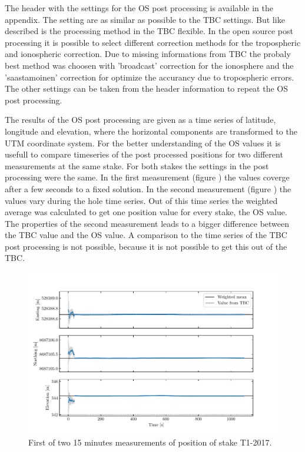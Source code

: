 The header with the settings for the OS post processing is available in the appendix.
The setting are as similar as possible to the TBC settings.
But like described is the processing method in the TBC flexible.
In the open source post processing it is possible to select different correction methods for the tropospheric and ionospheric correction. 
Due to missing informations from TBC the probaly best method was choosen with 'broadcast' correction for the ionosphere and the 'saastamoinen' correction for optimize the accurancy due to tropospheric errors. 
The other settings can be taken from the header information to repeat the OS post processing. 
\medskip

The results of the OS post processing are given as a time series of latitude, longitude and elevation, where the horizontal components are transformed to the UTM coordinate system. 
For the better understanding of the OS values it is usefull to compare timeseries of the post processed positions for two different measurements at the same stake.
For both stakes the settings in the post processing were the same.
In the first measurement (figure \label{GPS:fig:T1-i_timeseries}) the values coverge after a few seconds to a fixed solution.
In the second measurement (figure \label{GPS:fig:T1-ii_timeseries}) the values vary during the hole time series.
Out of this time series the weighted average was calculated to get one position value for every stake, the OS value.
The properties of the second measurement leads to a bigger difference between the TBC value and the OS value.
A comparison to the time series of the TBC post processing is not possible, because it is not possible to get this out of the TBC.

\begin{figure}[H]
    \centering
    \includegraphics[width=\textwidth]{./figs/timeseries/46250700_corr-T1-i-2017_Timeseries-east-north-elev.pdf}
    \caption{First of two 15 minutes measurements of position of stake T1-2017.}
    \label{GPS:fig:T1-i_timeseries}
\end{figure}

